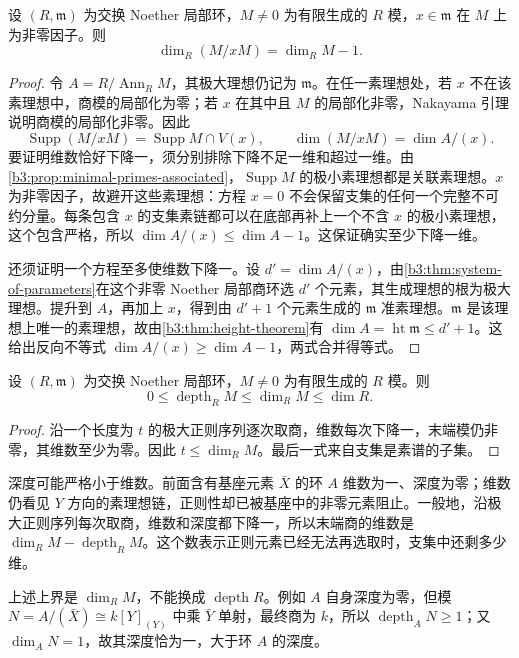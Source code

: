 \begin{proposition}\label{b3:prop:regular-quotient-dimension}
	设 \((R,\mathfrak m)\) 为交换 Noether 局部环，\(M\ne0\) 为有限生成的 \(R\) 模，\(x\in\mathfrak m\) 在 \(M\) 上为非零因子。则
	\[
		\dim_R(M/xM)=\dim_RM-1.
	\]
\end{proposition}
\begin{proof}
	令 \(A=R/\operatorname{Ann}_RM\)，其极大理想仍记为 \(\mathfrak m\)。在任一素理想处，若 \(x\) 不在该素理想中，商模的局部化为零；若 \(x\) 在其中且 \(M\) 的局部化非零，Nakayama 引理说明商模的局部化非零。因此
	\[
		\operatorname{Supp}(M/xM)=\operatorname{Supp}M\cap V(x),\qquad \dim(M/xM)=\dim A/(x).
	\]
	要证明维数恰好下降一，须分别排除下降不足一维和超过一维。由\cref{b3:prop:minimal-primes-associated}，\(\operatorname{Supp}M\) 的极小素理想都是关联素理想。\(x\) 为非零因子，故避开这些素理想：方程 \(x=0\) 不会保留支集的任何一个完整不可约分量。每条包含 \(x\) 的支集素链都可以在底部再补上一个不含 \(x\) 的极小素理想，这个包含严格，所以 \(\dim A/(x)\le\dim A-1\)。这保证确实至少下降一维。

	还须证明一个方程至多使维数下降一。设 \(d'=\dim A/(x)\)，由\cref{b3:thm:system-of-parameters}在这个非零 Noether 局部商环选 \(d'\) 个元素，其生成理想的根为极大理想。提升到 \(A\)，再加上 \(x\)，得到由 \(d'+1\) 个元素生成的 \(\mathfrak m\) 准素理想。\(\mathfrak m\) 是该理想上唯一的素理想，故由\cref{b3:thm:height-theorem}有 \(\dim A=\operatorname{ht}\mathfrak m\le d'+1\)。这给出反向不等式 \(\dim A/(x)\ge\dim A-1\)，两式合并得等式。
\end{proof}

\begin{corollary}\label{b3:cor:depth-dimension-bound}
	设 \((R,\mathfrak m)\) 为交换 Noether 局部环，\(M\ne0\) 为有限生成的 \(R\) 模。则
	\[
		0\le\operatorname{depth}_RM\le\dim_RM\le\dim R.
	\]
\end{corollary}
\begin{proof}
	沿一个长度为 \(t\) 的极大正则序列逐次取商，维数每次下降一，末端模仍非零，其维数至少为零。因此 \(t\le\dim_RM\)。最后一式来自支集是素谱的子集。
\end{proof}

深度可能严格小于维数。前面含有基座元素 \(\bar X\) 的环 \(A\) 维数为一、深度为零；维数仍看见 \(Y\) 方向的素理想链，正则性却已被基座中的非零元素阻止。一般地，沿极大正则序列每次取商，维数和深度都下降一，所以末端商的维数是 \(\dim_RM-\operatorname{depth}_RM\)。这个数表示正则元素已经无法再选取时，支集中还剩多少维。

上述上界是 \(\dim_RM\)，不能换成 \(\operatorname{depth}R\)。例如 \(A\) 自身深度为零，但模 \(N=A/(\bar X)\cong k[Y]_{(Y)}\) 中乘 \(\bar Y\) 单射，最终商为 \(k\)，所以 \(\operatorname{depth}_AN\ge1\)；又 \(\dim_AN=1\)，故其深度恰为一，大于环 \(A\) 的深度。


